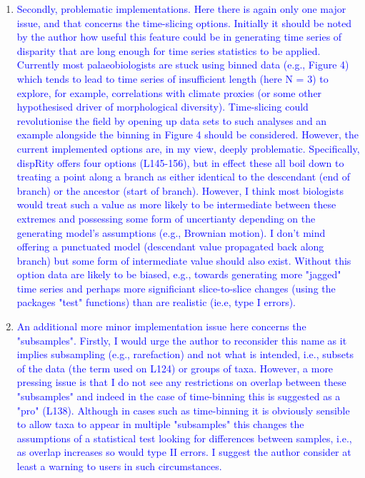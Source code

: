 \documentclass[12pt,letterpaper]{article}
\begin{document}
\begin{enumerate}
\item{\textcolor{blue}{Secondly, problematic implementations.
Here there is again only one major issue, and that concerns the time-slicing options.
Initially it should be noted by the author how useful this feature could be in generating time series of disparity that are long enough for time series statistics to be applied.
Currently most palaeobiologists are stuck using binned data (e.g., Figure 4) which tends to lead to time series of insufficient length (here N = 3) to explore, for example, correlations with climate proxies (or some other hypothesised driver of morphological diversity).
Time-slicing could revolutionise the field by opening up data sets to such analyses and an example alongside the binning in Figure 4 should be considered.
However, the current implemented options are, in my view, deeply problematic.
Specifically, dispRity offers four options (L145-156), but in effect these all boil down to treating a point along a branch as either identical to the descendant (end of branch) or the ancestor (start of branch).
However, I think most biologists would treat such a value as more likely to be intermediate between these extremes and possessing some form of uncertianty depending on the generating model's assumptions (e.g., Brownian motion).
I don't mind offering a punctuated model (descendant value propagated back along branch) but some form of intermediate value should also exist.
Without this option data are likely to be biased, e.g., towards generating more "jagged" time series and perhaps more significiant slice-to-slice changes (using the packages "test" functions) than are realistic (ie.e, type I errors).}}


\item{\textcolor{blue}{An additional more minor implementation issue here concerns the "subsamples". Firstly, I would urge the author to reconsider this name as it implies subsampling (e.g., rarefaction) and not what is intended, i.e., subsets of the data (the term used on L124) or groups of taxa. However, a more pressing issue is that I do not see any restrictions on overlap between these "subsamples" and indeed in the case of time-binning this is suggested as a "pro" (L138). Although in cases such as time-binning it is obviously sensible to allow taxa to appear in multiple "subsamples" this changes the assumptions of a statistical test looking for differences between samples, i.e., as overlap increases so would type II errors. I suggest the author consider at least a warning to users in such circumstances.}}


\end{enumerate}
\end{document}
